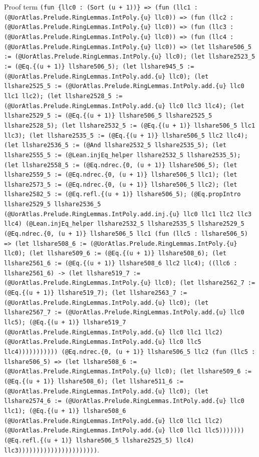 \documentclass[11pt]{article}
\begin{document}
\noindent Proof term \texttt{(fun \{llc0 : (Sort (u + 1))\} => (fun (llc1 : (@UorAtlas.Prelude.RingLemmas.IntPoly.\{u\} llc0)) => (fun (llc2 : (@UorAtlas.Prelude.RingLemmas.IntPoly.\{u\} llc0)) => (fun (llc3 : (@UorAtlas.Prelude.RingLemmas.IntPoly.\{u\} llc0)) => (fun (llc4 : (@UorAtlas.Prelude.RingLemmas.IntPoly.\{u\} llc0)) => (let llshare506\_5 := (@UorAtlas.Prelude.RingLemmas.IntPoly.\{u\} llc0); (let llshare2523\_5 := (@Eq.\{(u + 1)\} llshare506\_5); (let llshare945\_5 := (@UorAtlas.Prelude.RingLemmas.IntPoly.add.\{u\} llc0); (let llshare2525\_5 := (@UorAtlas.Prelude.RingLemmas.IntPoly.add.\{u\} llc0 llc1 llc2); (let llshare2528\_5 := (@UorAtlas.Prelude.RingLemmas.IntPoly.add.\{u\} llc0 llc3 llc4); (let llshare2529\_5 := (@Eq.\{(u + 1)\} llshare506\_5 llshare2525\_5 llshare2528\_5); (let llshare2532\_5 := (@Eq.\{(u + 1)\} llshare506\_5 llc1 llc3); (let llshare2535\_5 := (@Eq.\{(u + 1)\} llshare506\_5 llc2 llc4); (let llshare2536\_5 := (@And llshare2532\_5 llshare2535\_5); (let llshare2555\_5 := (@Lean.injEq\_helper llshare2532\_5 llshare2535\_5); (let llshare2558\_5 := (@Eq.ndrec.\{0, (u + 1)\} llshare506\_5); (let llshare2559\_5 := (@Eq.ndrec.\{0, (u + 1)\} llshare506\_5 llc1); (let llshare2573\_5 := (@Eq.ndrec.\{0, (u + 1)\} llshare506\_5 llc2); (let llshare2582\_5 := (@Eq.refl.\{(u + 1)\} llshare506\_5); (@Eq.propIntro llshare2529\_5 llshare2536\_5 (@UorAtlas.Prelude.RingLemmas.IntPoly.add.inj.\{u\} llc0 llc1 llc2 llc3 llc4) (@Lean.injEq\_helper llshare2532\_5 llshare2535\_5 llshare2529\_5 (@Eq.ndrec.\{0, (u + 1)\} llshare506\_5 llc1 (fun (llc5 : llshare506\_5) => (let llshare508\_6 := (@UorAtlas.Prelude.RingLemmas.IntPoly.\{u\} llc0); (let llshare509\_6 := (@Eq.\{(u + 1)\} llshare508\_6); (let llshare2561\_6 := (@Eq.\{(u + 1)\} llshare508\_6 llc2 llc4); ((llc6 : llshare2561\_6) -> (let llshare519\_7 := (@UorAtlas.Prelude.RingLemmas.IntPoly.\{u\} llc0); (let llshare2562\_7 := (@Eq.\{(u + 1)\} llshare519\_7); (let llshare2563\_7 := (@UorAtlas.Prelude.RingLemmas.IntPoly.add.\{u\} llc0); (let llshare2567\_7 := (@UorAtlas.Prelude.RingLemmas.IntPoly.add.\{u\} llc0 llc5); (@Eq.\{(u + 1)\} llshare519\_7 (@UorAtlas.Prelude.RingLemmas.IntPoly.add.\{u\} llc0 llc1 llc2) (@UorAtlas.Prelude.RingLemmas.IntPoly.add.\{u\} llc0 llc5 llc4))))))))))) (@Eq.ndrec.\{0, (u + 1)\} llshare506\_5 llc2 (fun (llc5 : llshare506\_5) => (let llshare508\_6 := (@UorAtlas.Prelude.RingLemmas.IntPoly.\{u\} llc0); (let llshare509\_6 := (@Eq.\{(u + 1)\} llshare508\_6); (let llshare511\_6 := (@UorAtlas.Prelude.RingLemmas.IntPoly.add.\{u\} llc0); (let llshare2574\_6 := (@UorAtlas.Prelude.RingLemmas.IntPoly.add.\{u\} llc0 llc1); (@Eq.\{(u + 1)\} llshare508\_6 (@UorAtlas.Prelude.RingLemmas.IntPoly.add.\{u\} llc0 llc1 llc2) (@UorAtlas.Prelude.RingLemmas.IntPoly.add.\{u\} llc0 llc1 llc5))))))) (@Eq.refl.\{(u + 1)\} llshare506\_5 llshare2525\_5) llc4) llc3))))))))))))))))))))))}.\par
\end{document}
